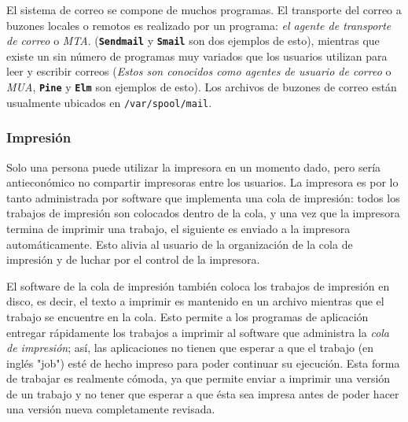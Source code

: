  El sistema de correo se compone de muchos programas. El transporte del
correo a buzones locales o remotos es realizado por un programa: \textit{el
agente de transporte de correo} o \textit{MTA}.
(\texttt{\textbf{Sendmail}} y \texttt{\textbf{Smail}} son dos ejemplos de
esto), mientras que existe un sin número de programas muy variados que los
usuarios utilizan para leer y escribir correos (\textit{Estos son conocidos
como agentes de usuario de correo }o \textit{MUA},
\texttt{\textbf{Pine}} y \texttt{\textbf{Elm}} son ejemplos de esto). Los
archivos de buzones de correo están usualmente ubicados en
\texttt{/var/spool/mail}.  




\subsubsection{ Impresión}

 Solo una persona puede utilizar la impresora en un momento dado, pero
sería antieconómico no compartir impresoras entre los usuarios. La impresora es
por lo tanto administrada por software que implementa una cola de impresión:
todos los trabajos de impresión son colocados dentro de la cola, y una vez que
la impresora termina de imprimir una trabajo, el siguiente es enviado a la
impresora automáticamente. Esto alivia al usuario de la organización de la cola
de impresión y de luchar por el control de la impresora.  

 El software de la cola de impresión también coloca los trabajos de
impresión en disco, es decir, el texto a imprimir es mantenido en un archivo
mientras que el trabajo se encuentre en la cola. Esto permite a los programas de
aplicación entregar rápidamente los trabajos a imprimir al software que
administra la \textit{cola de impresión}; así, las aplicaciones no
tienen que esperar a que el trabajo (en inglés "job") esté de hecho impreso para
poder continuar su ejecución. Esta forma de trabajar es realmente cómoda, ya que
permite enviar a imprimir una versión de un trabajo y no tener que esperar a que
ésta sea impresa antes de poder hacer una versión nueva completamente revisada.







